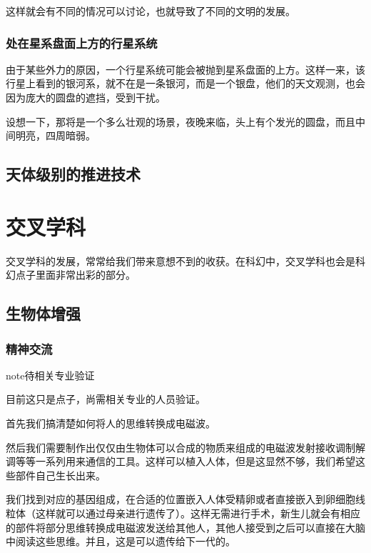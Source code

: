 \documentclass[letterpaper,10pt,english]{sphinxmanual}
\begin{document}
这样就会有不同的情况可以讨论，也就导致了不同的文明的发展。


\subsubsection{处在星系盘面上方的行星系统}
\label{astro:id5}
由于某些外力的原因，一个行星系统可能会被抛到星系盘面的上方。这样一来，该行星上看到的银河系，就不在是一条银河，而是一个银盘，他们的天文观测，也会因为庞大的圆盘的遮挡，受到干扰。

设想一下，那将是一个多么壮观的场景，夜晚来临，头上有个发光的圆盘，而且中间明亮，四周暗弱。


\subsection{天体级别的推进技术}
\label{astro:id6}

\section{交叉学科}
\label{interdispline::doc}\label{interdispline:id1}
交叉学科的发展，常常给我们带来意想不到的收获。在科幻中，交叉学科也会是科幻点子里面非常出彩的部分。


\subsection{生物体增强}
\label{interdispline:id2}

\subsubsection{精神交流}
\label{interdispline:index-0}\label{interdispline:id3}
\begin{notice}{note}{待相关专业验证}

目前这只是点子，尚需相关专业的人员验证。
\end{notice}

首先我们搞清楚如何将人的思维转换成电磁波。

然后我们需要制作出仅仅由生物体可以合成的物质来组成的电磁波发射接收调制解调等等一系列用来通信的工具。这样可以植入人体，但是这显然不够，我们希望这些部件自己生长出来。

我们找到对应的基因组成，在合适的位置嵌入人体受精卵或者直接嵌入到卵细胞线粒体（这样就可以通过母亲进行遗传了）。这样无需进行手术，新生儿就会有相应的部件将部分思维转换成电磁波发送给其他人，其他人接受到之后可以直接在大脑中阅读这些思维。并且，这是可以遗传给下一代的。
\end{document}
